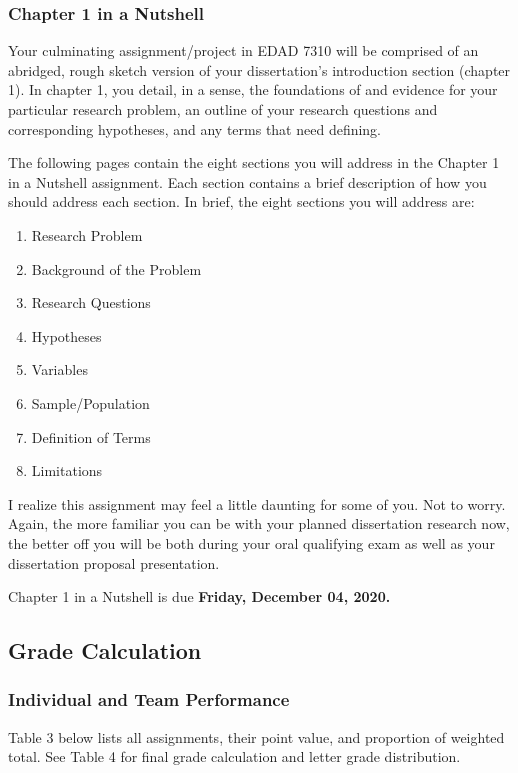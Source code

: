 \documentclass[
]{article}
\providecommand{\tightlist}{%
  \setlength{\itemsep}{0pt}\setlength{\parskip}{0pt}}
\begin{document}
\subsubsection{Chapter 1 in a Nutshell}

Your culminating assignment/project in EDAD 7310 will be comprised of an
abridged, rough sketch version of your dissertation's introduction
section (chapter 1). In chapter 1, you detail, in a sense, the
foundations of and evidence for your particular research problem, an
outline of your research questions and corresponding hypotheses, and any
terms that need defining.

The following pages contain the eight sections you will address in the
Chapter 1 in a Nutshell assignment. Each section contains a brief
description of how you should address each section. In brief, the eight
sections you will address are:

\begin{enumerate}
\def\labelenumi{\arabic{enumi}.}
\tightlist
\item
  Research Problem
\item
  Background of the Problem
\item
  Research Questions
\item
  Hypotheses
\item
  Variables
\item
  Sample/Population
\item
  Definition of Terms
\item
  Limitations
\end{enumerate}

I realize this assignment may feel a little daunting for some of you.
Not to worry. Again, the more familiar you can be with your planned
dissertation research now, the better off you will be both during your
oral qualifying exam as well as your dissertation proposal presentation.

Chapter 1 in a Nutshell is due \textbf{Friday, December 04, 2020.}

\subsection{Grade Calculation}

\subsubsection{Individual and Team Performance}

Table 3 below lists all assignments, their point value, and proportion
of weighted total. See Table 4 for final grade calculation and letter
grade distribution.
\end{document}
